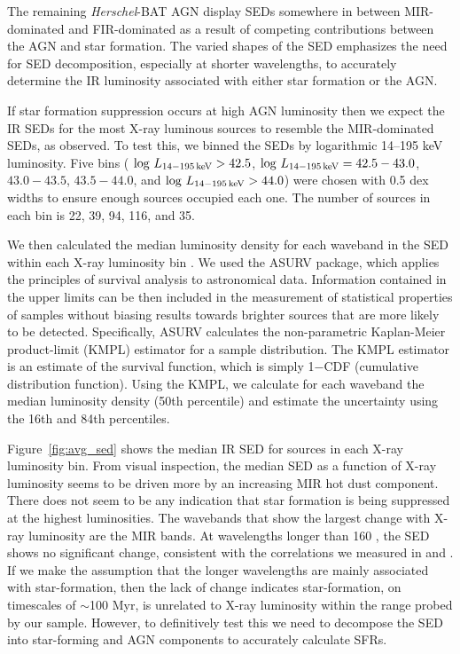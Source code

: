 \documentclass[fleqn, usenatbib]{mnras}
\newcommand{\herschel}{\emph{Herschel}}
\begin{document}
The remaining \herschel-BAT AGN display SEDs somewhere in between MIR-dominated and FIR-dominated as a result of competing contributions between the AGN and star formation. The varied shapes of the SED emphasizes the need for SED decomposition, especially at shorter wavelengths, to accurately determine the IR luminosity associated with either star formation or the AGN. 

If star formation suppression occurs at high AGN luminosity then we expect the IR SEDs for the most X-ray luminous sources to resemble the MIR-dominated SEDs, as \citet{Barger:2015ly} observed. To test this, we binned the SEDs by logarithmic 14--195 keV luminosity. Five bins ( $\log\,L_{\rm 14-195\,keV} > 42.5$, $\log\,L_{\rm 14-195\,keV} = 42.5-43.0$, $43.0-43.5$, $43.5-44.0$, and $\log\,L_{\rm 14-195\,keV} > 44.0$) were chosen with 0.5 dex widths to ensure enough sources occupied each one. The number of sources in each bin is 22, 39, 94, 116, and 35. 

We then calculated the median luminosity density for each waveband in the SED within each X-ray luminosity bin . We used the ASURV \citep{Feigelson:1985lr} package, which applies the principles of survival analysis to astronomical data. Information contained in the upper limits can be then included in the measurement of statistical properties of samples without biasing results towards brighter sources that are more likely to be detected. Specifically, ASURV calculates the non-parametric Kaplan-Meier product-limit (KMPL) estimator for a sample distribution. The KMPL estimator is an estimate of the survival function, which is simply 1$-$CDF (cumulative distribution function). Using the KMPL, we calculate for each waveband the median luminosity density (50th percentile) and estimate the uncertainty using the 16th and 84th percentiles. 

Figure~\ref{fig:avg_sed} shows the median IR SED for sources in each X-ray luminosity bin. From visual inspection, the median SED as a function of X-ray luminosity seems to be driven more by an increasing MIR hot dust component. There does not seem to be any indication that star formation is being suppressed at the highest luminosities. The wavebands that show the largest change with X-ray luminosity are the MIR bands. At wavelengths longer than 160 \micron, the SED shows no significant change, consistent with the correlations we measured in \citet{Melendez:2014yu} and \citet{Shimizu:2016qy}. If we make the assumption that the longer wavelengths are mainly associated with star-formation, then the lack of change indicates star-formation, on timescales of $\sim$100 Myr, is unrelated to X-ray luminosity within the range probed by our sample. However, to definitively test this we need to decompose the SED into star-forming and AGN components to accurately calculate SFRs.
\end{document}
